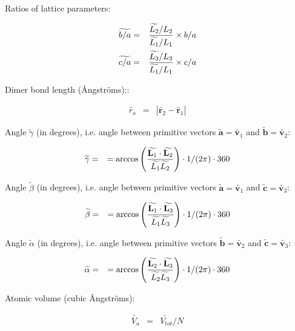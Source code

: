 \documentclass[a4paper,12pt,pdftex,onecolumn]{article}
\begin{document}
Ratios of lattice parameters:

\begin{eqnarray}
\widetilde{b/a} &=& { \widetilde{L_2}/L_2 \over \widetilde{L_1}/L_1 } \times b/a \\
\widetilde{c/a} &=& { \widetilde{L_3}/L_3 \over \widetilde{L_1}/L_1 } \times c/a
\end{eqnarray}

Dimer bond length (\AA{}ngstr\"oms)::

\begin{eqnarray}
\widetilde{r_o} &=& | \widetilde{\mathbf{r}_2} - \widetilde{\mathbf{r}_1} |
\end{eqnarray}

Angle $\widetilde{\gamma}$ (in degrees), i.e.
angle between primitive vectors
$\widetilde{\mathbf{a}} = \widetilde{\mathbf{v}_1}$ and
$\widetilde{\mathbf{b}} = \widetilde{\mathbf{v}_2}$:

\begin{eqnarray}
\widetilde{\gamma} &=&
= \arccos \left(
{ \widetilde{\mathbf{L}_1} \cdot \widetilde{\mathbf{L}_2} \over \widetilde{L_1} \widetilde{L_2} }
\right) \cdot 1/(2 \pi) \cdot 360
\end{eqnarray}

Angle $\widetilde{\beta}$ (in degrees), i.e.
angle between primitive vectors
$\widetilde{\mathbf{a}} = \widetilde{\mathbf{v}_1}$ and
$\widetilde{\mathbf{c}} = \widetilde{\mathbf{v}_3}$:

\begin{eqnarray}
\widetilde{\beta} &=&
= \arccos \left(
{ \widetilde{\mathbf{L}_1} \cdot \widetilde{\mathbf{L}_3} \over \widetilde{L_1} \widetilde{L_3} }
\right) \cdot 1/(2 \pi) \cdot 360
\end{eqnarray}

Angle $\widetilde{\alpha}$ (in degrees), i.e.
angle between primitive vectors
$\widetilde{\mathbf{b}} = \widetilde{\mathbf{v}_2}$ and
$\widetilde{\mathbf{c}} = \widetilde{\mathbf{v}_3}$:

\begin{eqnarray}
\widetilde{\alpha} &=&
= \arccos \left(
{ \widetilde{\mathbf{L}_2} \cdot \widetilde{\mathbf{L}_3} \over \widetilde{L_2} \widetilde{L_3} }
\right) \cdot 1/(2 \pi) \cdot 360
\end{eqnarray}

Atomic volume (cubic \AA{}ngstr\"oms):

\begin{eqnarray}
\widetilde{V_a} &=& \widetilde{V_{tot}}/N
\end{eqnarray}
\end{document}

